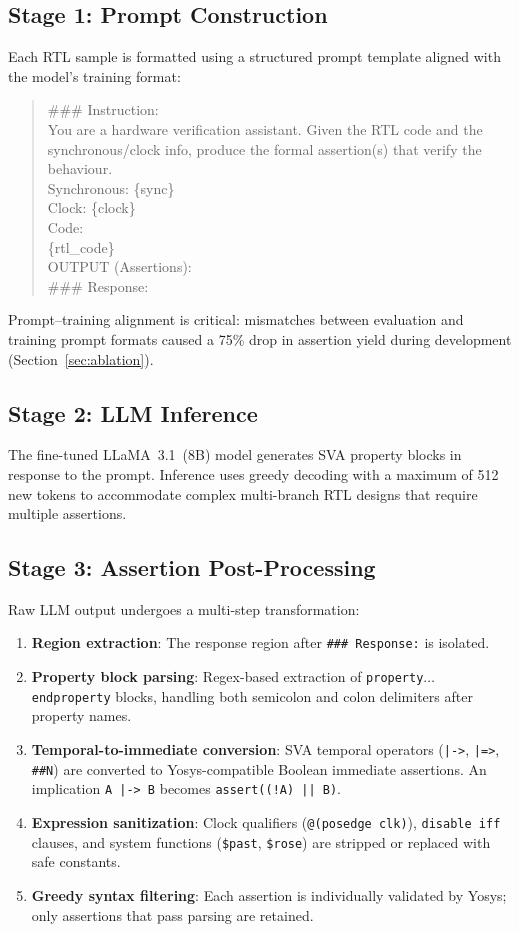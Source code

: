 \documentclass[conference]{IEEEtran}
\begin{document}
\subsection{Stage 1: Prompt Construction}
Each RTL sample is formatted using a structured prompt template aligned with the model's training format:
\begin{quote}
\small\ttfamily
\#\#\# Instruction:\\
You are a hardware verification assistant. Given the RTL code and the synchronous/clock info, produce the formal assertion(s) that verify the behaviour.\\[2pt]
Synchronous: \{sync\}\\
Clock: \{clock\}\\[2pt]
Code:\\
\{rtl\_code\}\\[2pt]
OUTPUT (Assertions):\\[2pt]
\#\#\# Response:
\end{quote}
Prompt--training alignment is critical: mismatches between evaluation and training prompt formats caused a 75\% drop in assertion yield during development (Section~\ref{sec:ablation}).

\subsection{Stage 2: LLM Inference}
The fine-tuned LLaMA~3.1~(8B) model generates SVA property blocks in response to the prompt. Inference uses greedy decoding with a maximum of 512 new tokens to accommodate complex multi-branch RTL designs that require multiple assertions.

\subsection{Stage 3: Assertion Post-Processing}
\label{sec:postproc}
Raw LLM output undergoes a multi-step transformation:
\begin{enumerate}
    \item \textbf{Region extraction}: The response region after \texttt{\#\#\# Response:} is isolated.
    \item \textbf{Property block parsing}: Regex-based extraction of \texttt{property}$\ldots$\texttt{endproperty} blocks, handling both semicolon and colon delimiters after property names.
    \item \textbf{Temporal-to-immediate conversion}: SVA temporal operators (\texttt{|->}, \texttt{|=>}, \texttt{\#\#N}) are converted to Yosys-compatible Boolean immediate assertions. An implication \texttt{A |-> B} becomes \texttt{assert((!A) || B)}.
    \item \textbf{Expression sanitization}: Clock qualifiers (\texttt{@(posedge clk)}), \texttt{disable iff} clauses, and system functions (\texttt{\$past}, \texttt{\$rose}) are stripped or replaced with safe constants.
    \item \textbf{Greedy syntax filtering}: Each assertion is individually validated by Yosys; only assertions that pass parsing are retained.
\end{enumerate}
\end{document}
